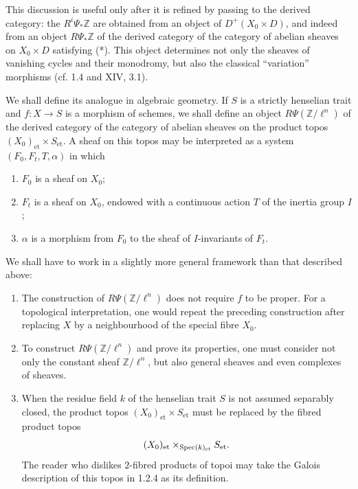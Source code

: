 
This discussion is useful only after it is refined by passing to the
derived category: the $R^i\Psi_*\mathbb Z$ are obtained from an object
of $D^+(X_0\times D)$, and indeed from an object
$R\Psi_*\mathbb Z$ of the derived category of the category of abelian
sheaves on $X_0\times D$ satisfying (*).  This object determines not
only the sheaves of vanishing cycles and their monodromy, but also the
classical ``variation'' morphisms (cf. 1.4 and XIV, 3.1).

We shall define its analogue in algebraic geometry.  If $S$ is a
strictly henselian trait and $f:X\longrightarrow S$ is a morphism of
schemes, we shall define an object $R\Psi(\mathbb Z/\ell^n)$ of the
derived category of the category of abelian sheaves on the product
topos $(X_0)_{\mathrm{et}}\times S_{\mathrm{et}}$.  A sheaf on this
topos may be interpreted as a system $(F_0,F_t,T,\alpha)$ in which
\begin{enumerate}[label=\alph*),leftmargin=2.5em]
\item $F_0$ is a sheaf on $X_0$;
\item $F_t$ is a sheaf on $X_0$, endowed with a continuous action $T$
of the inertia group $I$;
\item $\alpha$ is a morphism from $F_0$ to the sheaf of $I$-invariants
of $F_t$.
\end{enumerate}

We shall have to work in a slightly more general framework than that
described above:
\begin{enumerate}[label=\alph*),leftmargin=2.5em]
\item The construction of $R\Psi(\mathbb Z/\ell^n)$ does not require
$f$ to be proper.  For a topological interpretation, one would repeat
the preceding construction after replacing $X$ by a neighbourhood of
the special fibre $X_0$.

\item To construct $R\Psi(\mathbb Z/\ell^n)$ and prove its properties,
one must consider not only the constant sheaf $\mathbb Z/\ell^n$, but
also general sheaves and even complexes of sheaves.

\item When the residue field $k$ of the henselian trait $S$ is not
assumed separably closed, the product topos
$(X_0)_{\mathrm{et}}\times S_{\mathrm{et}}$ must be replaced by the
fibred product topos
\begin{equation*}
(X_0)_{\mathrm{et}}
\times_{\operatorname{Spec}(k)_{\mathrm{et}}}S_{\mathrm{et}}.
\end{equation*}
The reader who dislikes $2$-fibred products of topoi may take the Galois
description of this topos in 1.2.4 as its definition.
\end{enumerate}

